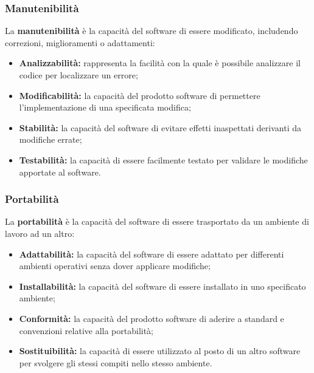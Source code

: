 \begin{flushleft}
\subsubsection{Manutenibilità}
La \textbf{manutenibilità} è la capacità del software di essere modificato, includendo correzioni, miglioramenti o adattamenti:
\begin{itemize}
	\item \textbf{Analizzabilità:} rappresenta la facilità con la quale è possibile analizzare il codice per localizzare un errore;
	\item \textbf{Modificabilità:} la capacità del prodotto software di permettere l'implementazione di una specificata modifica;
	\item \textbf{Stabilità:} la capacità del software di evitare effetti inaspettati derivanti da modifiche errate;
	\item \textbf{Testabilità:} la capacità di essere facilmente testato per validare le modifiche apportate al software.
\end{itemize}

\subsubsection{Portabilità}
La \textbf{portabilità} è la capacità del software di essere trasportato da un ambiente di lavoro ad un altro:
\begin{itemize}
	\item \textbf{Adattabilità:} la capacità del software di essere adattato per differenti ambienti operativi senza dover applicare modifiche;
	\item \textbf{Installabilità:} la capacità del software di essere installato in uno specificato ambiente;
	\item \textbf{Conformità:} la capacità del prodotto software di aderire a standard e convenzioni relative alla portabilità;
	\item \textbf{Sostituibilità:} la capacità di essere utilizzato al posto di un altro software per svolgere gli stessi compiti nello stesso ambiente.
\end{itemize}



\end{flushleft}